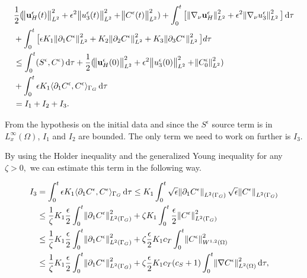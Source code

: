 \documentclass[11pt]{article}
\newcommand*\diff{\mathop{}\!\mathrm{d}}
\begin{document}
  \begin{equation}
    \begin{split}  
    & \frac{1}{2} (\norm{\mathbf{u}_H^\epsilon (t)}_{L^2}^2 + \epsilon ^ 2 \norm{u_3^\epsilon (t)}_{L^2}^2 + \norm{C^\epsilon (t)}_{L^2}^2) + \int_0 ^ t \big[ \norm{\nabla_\nu \mathbf{u}_H^\epsilon}_{L^2}^2 + \epsilon ^ 2 \norm{\nabla_\nu u_3^\epsilon}_{L^2}^2  \big] \diff \tau \\
    & + \int_0 ^ t  \big [ \epsilon K_1 \norm{\partial_1 C^\epsilon}_{L^2}^2  + K_2 \norm{\partial_2 C^\epsilon}_{L^2}^2 + K_3 \norm{\partial_3 C^\epsilon}_{L^2}^2 \big ] d \tau \\
    & \leq \int_0^t (S^\epsilon,C^\epsilon) \diff \tau + \frac{1}{2} (\norm{\mathbf{u}_H^\epsilon (0)}_{L^2}^2 + \epsilon ^ 2 \norm{u_3^\epsilon (0)}_{L^2}^2 + \norm{C^\epsilon_0}_{L^2}^2) \\
    & + \int _ 0 ^ t \epsilon K_1 \langle \partial_1 C^\epsilon, C^\epsilon \rangle_{\Gamma_G} \diff \tau \\
    & = I_1 + I_2 + I_3. \raisetag{70pt} \label{energyIEQ}
    \end{split}
  \end{equation}    
  
  From the hypothesis on the initial data and since the $S^\epsilon$ source term is in $L^\infty_x (\Omega)$, $I_1$ and $I_2$ are bounded. The only term we need to work on further is $I_3$.
  
  By using the Holder inequality and the generalized Young inequality for any $\zeta > 0,$ we can estimate this term in the following way.
  
  \begin{equation}
    \begin{split}  
    I_3 & = \int _ 0 ^ t \epsilon K_1 \langle \partial_1 C^\epsilon, C^\epsilon \rangle_{\Gamma_G} \diff \tau \leq K_1 \int _ 0 ^ t \sqrt{\epsilon} \norm{\partial_1 C^\epsilon}_{L^2 (\Gamma_G)} \sqrt{\epsilon} \norm{C^\epsilon}_{L^2 (\Gamma_G)} \\
    & \leq \frac{1}{\zeta} K_1 \frac{\epsilon}{2} \int_0 ^ t \norm{\partial_1 C^\epsilon}^2 _{L^2 (\Gamma_G)} + \zeta K_1 \int_0 ^ t \frac{\epsilon}{2} \norm{C^\epsilon}^2 _{L^2 (\Gamma_G)} \\
    & \leq \frac{1}{\zeta} K_1 \frac{\epsilon}{2} \int_0 ^ t \norm{\partial_1 C^\epsilon}^2 _{L^2 (\Gamma_G)} + \zeta \frac{\epsilon}{2} K_1 c_T \int_0 ^ t \norm{C^\epsilon}^2 _{W^{1,2} (\Omega)} \\
    & \leq \frac{1}{\zeta} K_1 \frac{\epsilon}{2} \int_0 ^ t \norm{\partial_1 C^\epsilon}^2 _{L^2 (\Gamma_G)} + \zeta \frac{\epsilon}{2} K_1 c_T (c_S + 1) \int_0 ^ t \norm{\nabla C^\epsilon}^2 _{L^2 (\Omega) } \diff \tau,
    \end{split}
  \end{equation}  
  
\end{document}
